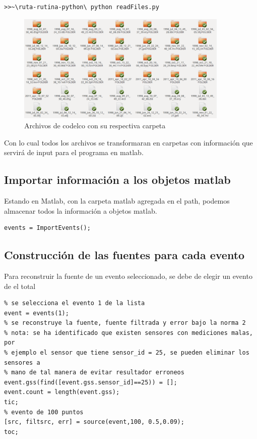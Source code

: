 \begin{verbatim}
>>~\ruta-rutina-python\ python readFiles.py
\end{verbatim}

\begin{figure}[H]
\includegraphics[width=0.9\textwidth,height=0.4\textheight]{linea_timerev/figuras/folders.pdf}
\caption{Archivos de codelco con su respectiva carpeta}
\end{figure}



Con lo cual todos los archivos se transformaran en carpetas con información que 
servirá de input para el programa en matlab.

\subsection{Importar información a los objetos matlab}
Estando en Matlab, con la carpeta matlab agregada en el path, podemos almacenar 
todos la información a objetos matlab.

\begin{verbatim}
events = ImportEvents();
\end{verbatim}
\subsection{Construcción de las fuentes para cada evento }
Para reconstruir la fuente de un evento seleccionado, se debe de elegir un evento
de el total
\begin{verbatim}
% se selecciona el evento 1 de la lista
event = events(1);
% se reconstruye la fuente, fuente filtrada y error bajo la norma 2
% nota: se ha identificado que existen sensores con mediciones malas, por
% ejemplo el sensor que tiene sensor_id = 25, se pueden eliminar los sensores a
% mano de tal manera de evitar resultador erroneos
event.gss(find([event.gss.sensor_id]==25)) = [];
event.count = length(event.gss);
tic;
% evento de 100 puntos
[src, filtsrc, err] = source(event,100, 0.5,0.09);
toc;
\end{verbatim}

